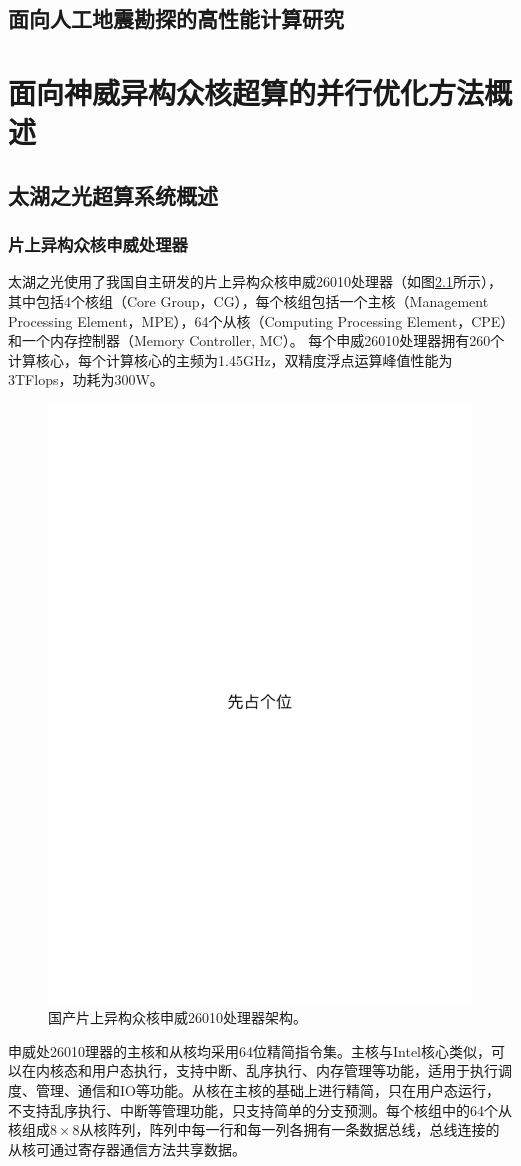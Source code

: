 \documentclass[degree=doctor]{thuthesis}
\begin{document}
\section{面向人工地震勘探的高性能计算研究}



\chapter{面向神威异构众核超算的并行优化方法概述}

\section{太湖之光超算系统概述}
\subsection{片上异构众核申威处理器}


太湖之光使用了我国自主研发的片上异构众核申威26010处理器（如图\ref{fig:sunwaycpu}所示），其中包括4个核组（Core Group，CG）\citep {fu2016sunway}，每个核组包括一个主核（Management Processing Element，MPE），64个从核（Computing Processing Element，CPE）和一个内存控制器（Memory Controller, MC）。 每个申威26010处理器拥有260个计算核心，每个计算核心的主频为1.45GHz，双精度浮点运算峰值性能为3TFlops，功耗为300W。

\begin{figure}[ht]
\centering
\includegraphics[width=.3\columnwidth]{placeholder.pdf}
\caption{国产片上异构众核申威26010处理器架构。}
\label{fig:sunwaycpu}
\end{figure}

申威处26010理器的主核和从核均采用64位精简指令集。主核与Intel核心类似，可以在内核态和用户态执行，支持中断、乱序执行、内存管理等功能，适用于执行调度、管理、通信和IO等功能。从核在主核的基础上进行精简，只在用户态运行，不支持乱序执行、中断等管理功能，只支持简单的分支预测。每个核组中的64个从核组成$8\times8$从核阵列，阵列中每一行和每一列各拥有一条数据总线，总线连接的从核可通过寄存器通信方法共享数据。
\end{document}
